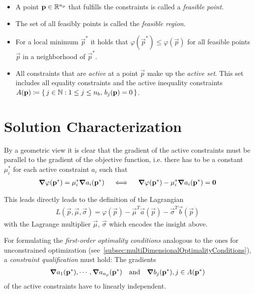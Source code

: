 	\begin{itemize}
		\item A point \( \boldsymbol{\mathrm{p}} \in \mathbb{R}^{n_p} \) that fulfills the constraints is called a \emph{feasible point}.
		\item The set of all feasibly points is called the \emph{feasible region}.
		\item For a local minimum \( \vec{p}^\ast \) it holds that \( \varphi(\vec{p}^\ast) \leq \varphi(\vec{p}) \) for all feasible points \(\vec{p}\) in a neighborhood of \(\vec{p}^\ast\).
		\item All constraints that are \emph{active} at a point \(\vec{p}\) make up the \emph{active set}. This set includes all equality constraints and the active inequality constraints \( A(\boldsymbol{\mathrm{p}}) \coloneqq \{\, j \in \mathbb{N} : 1 \leq j \leq n_b,\, b_j(\boldsymbol{\mathrm{p}}) = 0 \,\} \).
	\end{itemize}

	\section{Solution Characterization}
		By a geometric view it is clear that the gradient of the active constraints must be parallel to the gradient of the objective function, i.e. there has to be a constant \( \mu_i^\ast \) for each active constraint \( a_i \) such that
		\begin{align*}
			\grad{\varphi}(\boldsymbol{\mathrm{p}}^\ast) = \mu_i^\ast \grad{a_i}(\boldsymbol{\mathrm{p}}^\ast)
			\quad\iff\quad
			\grad{\varphi}(\boldsymbol{\mathrm{p}}^\ast) - \mu_i^\ast \grad{a_i}(\boldsymbol{\mathrm{p}}^\ast) = \boldsymbol{\mathrm{0}}
		\end{align*}
		
		This leads directly leads to the definition of the Lagrangian
		\begin{align*}
			L(\vec{p}, \vec{\mu}, \vec{\sigma}) = \varphi(\vec{p}) - \vec{\mu}^T \vec{a}(\vec{p}) - \vec{\sigma}^T \vec{b}(\vec{p})
		\end{align*}
		with the Lagrange multiplier \( \vec{\mu} \), \( \vec{\sigma} \) which encodes the insight above.
		
		For formulating the \emph{first-order optimality conditions} analogous to the ones for unconstrained optimization (see~\autoref{subsec:multiDimensionalOptimalityConditions}), a \emph{constraint qualification} must hold: The gradients
		\begin{align*}
			\grad{a_1}(\boldsymbol{\mathrm{p}}^\ast), \cdots, \grad{a_{n_p}}(\boldsymbol{\mathrm{p}}^\ast) \quad\text{and}\quad \grad{b_j}(\boldsymbol{\mathrm{p}}^\ast), j \in A(\boldsymbol{\mathrm{p}}^\ast)
		\end{align*}
		of the active constraints have to linearly independent.

